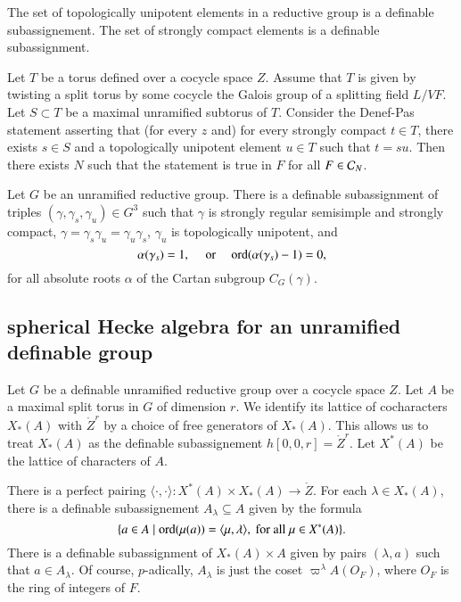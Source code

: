 \begin{lemma} The set of topologically unipotent elements in a reductive group is a definable subassignement.
The set of strongly compact elements is a definable subassignment.
\end{lemma}

\begin{lemma} Let $T$ be a torus defined over a cocycle space $Z$. Assume that $T$ is given by twisting a split torus by some cocycle the Galois group
of a splitting field $L/VF$.  Let $S\subset T$ be a maximal unramified subtorus of $T$.  Consider the Denef-Pas statement asserting that (for every $z$ and) for
every strongly compact $t\in T$, 
there exists $s\in S$ and a topologically unipotent element $u\in T$ such that $t =s u$.  Then there exists $N$ such that the statement is
true in $F$ for all $F\in \mathcal C_N$.
\end{lemma}

\begin{lemma} 
Let $G$ be an unramified reductive group.  There is a definable subassignment of triples $(\gamma,\gamma_s,\gamma_u)\in G^3$
 such that $\gamma$ is strongly regular semisimple and strongly compact, 
$\gamma = \gamma_s \gamma_u = \gamma_u\gamma_s$, $\gamma_u$ is topologically unipotent, and
\[
\alpha(\gamma_s)=1,\quad\text{ or }\quad {\operatorname{ord}}(\alpha(\gamma_s)-1)=0,
\]
for all absolute roots $\alpha$ of the Cartan subgroup $C_G(\gamma)$.
\end{lemma}


\subsection{spherical Hecke algebra for an unramified definable group}

Let $G$ be a definable unramified reductive group over a cocycle space $Z$.  Let $A$ be a maximal split torus in $G$ of dimension
$r$.  We identify its lattice of cocharacters $X_*(A)$ with $\ring{Z}^r$ by a choice of free generators of $X_*(A)$.
This allows us to treat $X_*(A)$ as the definable subassignement $h[0,0,r] = \ring{Z}^r$.  Let $X^*(A)$ be the lattice of
characters of $A$.

There is a perfect pairing $\langle\cdot,\cdot\rangle:X^*(A)\times X_*(A) \to \ring{Z}$.
For each $\lambda\in X_*(A)$, there is a definable subassignement $A_\lambda \subseteq A$ given by the formula
\[
\{ a \in A \mid {\operatorname{ord}}(\mu(a)) = \langle{\mu,\lambda}\rangle,\text{ for all } \mu\in X^*(A) \}.
\]
There is a definable subassignment of $X_*(A)\times A$
given by pairs $(\lambda,a)$  such that $a\in A_\lambda$.  
Of course, $p$-adically, $A_\lambda$ is just the coset $\varpi^\lambda A(O_F)$, where $O_F$ is the ring of integers of $F$.

